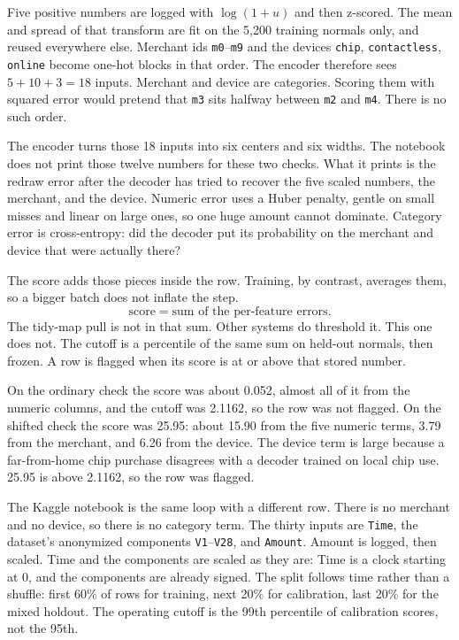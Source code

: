 \documentclass[11pt]{article}
\begin{document}
Five positive numbers are logged with $\log(1+u)$ and then z-scored.
The mean and spread of that transform are fit on the 5{,}200 training
normals only, and reused everywhere else. Merchant ids \texttt{m0}--\texttt{m9}
and the devices \texttt{chip}, \texttt{contactless}, \texttt{online}
become one-hot blocks in that order. The encoder therefore sees
$5+10+3=18$ inputs. Merchant and device are categories. Scoring them with
squared error would pretend that \texttt{m3} sits halfway between
\texttt{m2} and \texttt{m4}. There is no such order.

The encoder turns those 18 inputs into six centers and six widths.
The notebook does not print those twelve numbers for these two checks.
What it prints is the redraw error after the decoder has tried to recover
the five scaled numbers, the merchant, and the device. Numeric error uses
a Huber penalty, gentle on small misses and linear on large ones, so one
huge amount cannot dominate. Category error is cross-entropy: did the
decoder put its probability on the merchant and device that were actually
there?

The score adds those pieces inside the row. Training, by contrast,
averages them, so a bigger batch does not inflate the step.
\[
\mathrm{score} = \text{sum of the per-feature errors}.
\]
The tidy-map pull is not in that sum. Other systems do threshold it.
This one does not. The cutoff is a percentile of the same sum on held-out
normals, then frozen. A row is flagged when its score is at or above
that stored number.

On the ordinary check the score was about 0.052, almost all of it from
the numeric columns, and the cutoff was 2.1162, so the row was not
flagged. On the shifted check the score was 25.95: about 15.90 from the
five numeric terms, 3.79 from the merchant, and 6.26 from the device.
The device term is large because a far-from-home chip purchase disagrees
with a decoder trained on local chip use. 25.95 is above 2.1162, so the
row was flagged.

The Kaggle notebook is the same loop with a different row. There is no
merchant and no device, so there is no category term. The thirty inputs
are \texttt{Time}, the dataset's anonymized components \texttt{V1}--\texttt{V28},
and \texttt{Amount}. Amount is logged, then scaled. Time and the
components are scaled as they are: Time is a clock starting at 0, and the
components are already signed. The split follows time rather than a
shuffle: first 60\% of rows for training, next 20\% for calibration,
last 20\% for the mixed holdout. The operating cutoff is the 99th
percentile of calibration scores, not the 95th.
\end{document}
